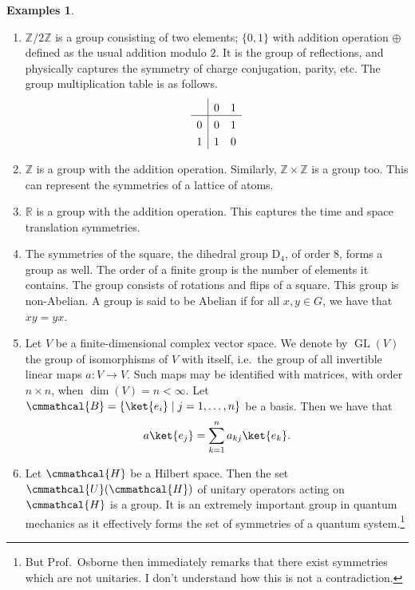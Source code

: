 \documentclass[a4 paper, 12pt]{book}
\renewcommand{\mathcal}{\cmmathcal}
\theoremstyle{definition}
\newtheorem{examples}[theorem]{Examples}
\newcommand{\rr}{\mathbb{R}}
\newcommand{\zz}{\mathbb{Z}}
\DeclareMathOperator{\GL}{GL}
\newcommand{\basis}{\mathcal{B}}
\newcommand{\hilbert}{\mathcal{H}}
\newcommand{\unitary}{\mathcal{U}}
\begin{document}
	\begin{examples}
		\leavevmode \vspace{-\baselineskip}\vspace{12pt}
		\begin{enumerate}[label={(\alph*)},ref={\alph*}]
			\item \(\zz / 2\zz\) is a group consisting of two elements; \(\{0, 1\}\) with addition operation \(\oplus\) defined as the usual addition modulo \(2\). It is the group of reflections, and physically captures the symmetry of charge conjugation, parity, etc.
			The group multiplication table is as follows.
			\begin{equation*}
				\setlength{\extrarowheight}{3pt}%
				\begin{array}{l|*{5}{l}}
						& 0   & 1\\
					\hline
					0   & 0   & 1\\
					1   & 1   & 0\\
				\end{array}
			\end{equation*}
			\item \(\zz\) is a group with the addition operation. Similarly, \(\zz \times \zz\) is a group too. This can represent the symmetries of a lattice of atoms.
			\item \(\rr\) is a group with the addition operation. This captures the time and space translation symmetries.
			\item The symmetries of the square, the dihedral group \(\mathrm{D}_4\), of order \(8\), forms a group as well. The order of a finite group is the number of elements it contains. The group consists of rotations and flips of a square. This group is non-Abelian. A group is said to be Abelian if for all \(x, y \in G\), we have that \(xy = yx\).
			\item Let \(V\) be a finite-dimensional complex vector space. We denote by \(\GL(V)\) the group of isomorphisms of \(V\) with itself, i.e.\ the group of all invertible linear maps \(a \colon V \rightarrow V\). Such maps may be identified with matrices, with order \(n \times n\), when \(\dim (V) = n < \infty\). Let \(\basis = \{\ket{e_i} \mid j = 1, \ldots, n\}\) be a basis. Then we have that
			\begin{equation*}
				a\ket{e_j} = \sum_{k=1}^n a_{kj}\ket{e_k}.
			\end{equation*}
			\item Let \(\hilbert\) be a Hilbert space. Then the set \(\unitary(\hilbert)\) of unitary operators acting on \(\hilbert\) is a group. It is an extremely important group in quantum mechanics as it effectively forms the set of symmetries of a quantum system.\footnote{But Prof.\ Osborne then immediately remarks that there exist symmetries which are not unitaries. I don't understand how this is not a contradiction.}
		\end{enumerate}
	\end{examples}
\end{document}
